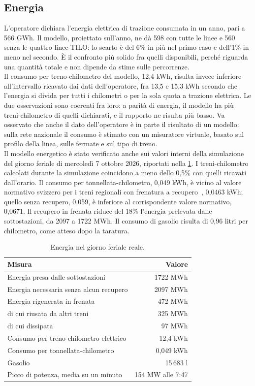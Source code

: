 \subsection{Energia}
L'operatore dichiara l'energia elettrica di trazione consumata in un anno, pari a 566 GWh. Il modello, proiettato sull'anno, ne dà 598 con tutte le linee e 560 senza le quattro linee TILO: lo scarto è del 6\% in più nel primo caso e dell'1\% in meno nel secondo. È il confronto più solido fra quelli disponibili, perché riguarda una quantità totale e non dipende da stime sulle percorrenze. \\
Il consumo per treno-chilometro del modello, 12,4 kWh, risulta invece inferiore all'intervallo ricavato dai dati dell'operatore, fra 13,5 e 15,3 kWh secondo che l'energia si divida per tutti i chilometri o per la sola quota a trazione elettrica. Le due osservazioni sono coerenti fra loro: a parità di energia, il modello ha più treni-chilometro di quelli dichiarati, e il rapporto ne risulta più basso. Va osservato che anche il dato dell'operatore è in parte il risultato di un modello: sulla rete nazionale il consumo è stimato con un misuratore virtuale, basato sul profilo della linea, sulle fermate e sul tipo di treno. \\
Il modello energetico è stato verificato anche sui valori interni della simulazione del giorno feriale di mercoledì 7 ottobre 2026, riportati nella \cref{tab:energia-verifica}. I treni-chilometro calcolati durante la simulazione coincidono a meno dello 0,5\% con quelli ricavati dall'orario. Il consumo per tonnellata-chilometro, 0,049 kWh, è vicino al valore normativo svizzero per i treni regionali con frenatura a recupero~\cite{uft_consumi}, 0,0463 kWh; quello senza recupero, 0,059, è inferiore al corrispondente valore normativo, 0,0671. Il recupero in frenata riduce del 18\% l'energia prelevata dalle sottostazioni, da 2097 a 1722 MWh. Il consumo di gasolio risulta di 0,96 litri per chilometro, come atteso dopo la taratura.

\begin{table}[H]
	\centering
	\caption{Energia nel giorno feriale reale.}
	\label{tab:energia-verifica}
	\begin{tabularx}{\textwidth}{Xr}
		\toprule
		Misura & Valore \\
		\midrule
		Energia presa dalle sottostazioni & 1722 MWh \\
		Energia necessaria senza alcun recupero & 2097 MWh \\
		Energia rigenerata in frenata & 472 MWh \\
		\quad di cui riusata da altri treni & 325 MWh \\
		\quad di cui dissipata & 97 MWh \\
		Consumo per treno-chilometro elettrico & 12,4 kWh \\
		Consumo per tonnellata-chilometro & 0,049 kWh \\
		Gasolio & 15\,683 l \\
		Picco di potenza, media su un minuto & 154 MW alle 7:47 \\
		\bottomrule
	\end{tabularx}
\end{table}

